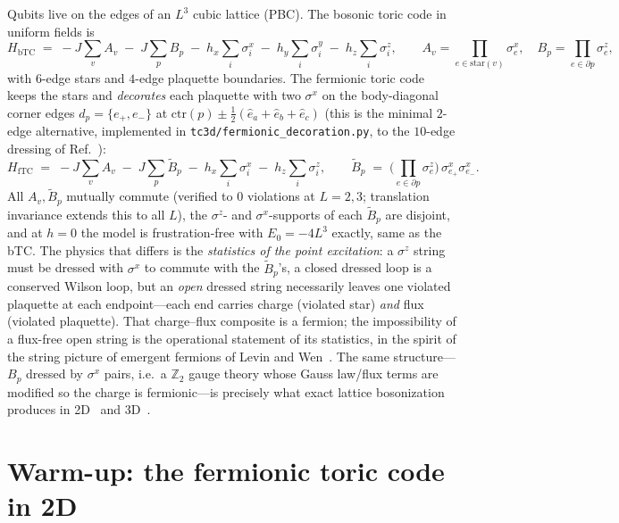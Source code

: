 \documentclass[11pt]{article}
\newcommand{\Av}{A_v}
\newcommand{\Bp}{B_p}
\newcommand{\Bt}{\tilde B_p}
\newcommand{\sx}{\sigma^x}
\newcommand{\sy}{\sigma^y}
\newcommand{\sz}{\sigma^z}
\begin{document}
Qubits live on the edges of an $L^3$ cubic lattice (PBC). The bosonic toric
code in uniform fields is
\begin{equation}
H_{\mathrm{bTC}} \;=\; -J\sum_v \Av \;-\; J\sum_p \Bp
\;-\; h_x\sum_i \sx_i \;-\; h_y\sum_i \sy_i \;-\; h_z\sum_i \sz_i ,
\qquad
\Av=\!\!\prod_{e\in\mathrm{star}(v)}\!\!\sx_e,\quad
\Bp=\!\!\prod_{e\in\partial p}\!\!\sz_e ,
\end{equation}
with $6$-edge stars and $4$-edge plaquette boundaries. The fermionic toric code
keeps the stars and \emph{decorates} each plaquette with two $\sx$ on the
body-diagonal corner edges $d_p=\{e_+,e_-\}$ at
$\mathrm{ctr}(p)\pm\tfrac12(\hat e_a+\hat e_b+\hat e_c)$
(this is the minimal $2$-edge alternative, implemented in
\texttt{tc3d/fermionic\_decoration.py}, to the $10$-edge dressing of
Ref.~\cite{WangLevin2014}):
\begin{equation}
H_{\mathrm{fTC}} \;=\; -J\sum_v \Av \;-\; J\sum_p \Bt \;-\; h_x\sum_i \sx_i
\;-\; h_z\sum_i \sz_i,
\qquad
\Bt \;=\; \Big(\prod_{e\in\partial p}\sz_e\Big)\,\sx_{e_+}\sx_{e_-} .
\end{equation}
All $\Av,\Bt$ mutually commute (verified to $0$ violations at $L=2,3$;
translation invariance extends this to all $L$), the $\sz$- and $\sx$-supports
of each $\Bt$ are disjoint, and at $h=0$ the model is frustration-free with
$E_0=-4L^3$ exactly, same as the bTC. The physics that differs is the
\emph{statistics of the point excitation}: a $\sz$ string must be dressed with
$\sx$ to commute with the $\Bt$'s, a closed dressed loop is a conserved Wilson
loop, but an \emph{open} dressed string necessarily leaves one violated
plaquette at each endpoint---each end carries charge (violated star)
\emph{and} flux (violated plaquette). That charge--flux composite is a fermion;
the impossibility of a flux-free open string is the operational statement of
its statistics, in the spirit of the string picture of emergent fermions of
Levin and Wen~\cite{LevinWen2003}. The same structure---$\Bp$ dressed by
$\sx$ pairs, i.e.\ a $\mathbb{Z}_2$ gauge theory whose Gauss law/flux terms are
modified so the charge is fermionic---is precisely what exact lattice
bosonization produces in 2D~\cite{ChenKapustinRadicevic2018} and
3D~\cite{ChenKapustin2019}.

\section{Warm-up: the fermionic toric code in 2D}
\label{sec:2d}
\end{document}
